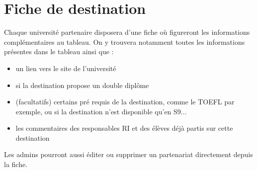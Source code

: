  \section{Fiche de destination}
 Chaque université partenaire disposera d'une fiche où figureront les informations complémentaires au tableau.
 On y trouvera notamment toutes les informations présentes dans le tableau ainsi que :
 \begin{itemize}
 	\item un lien vers le site de l'université
 	\item si la destination propose un double diplôme
 	\item (facultatifs) certains pré requis de la destination, comme le TOEFL par exemple, ou si la destination n'est disponible qu'en S9...
 	\item les commentaires des responsables RI et des élèves déjà partis sur cette destination
 \end{itemize}
 

 
 Les admins pourront aussi éditer ou supprimer un partenariat directement depuis la fiche.